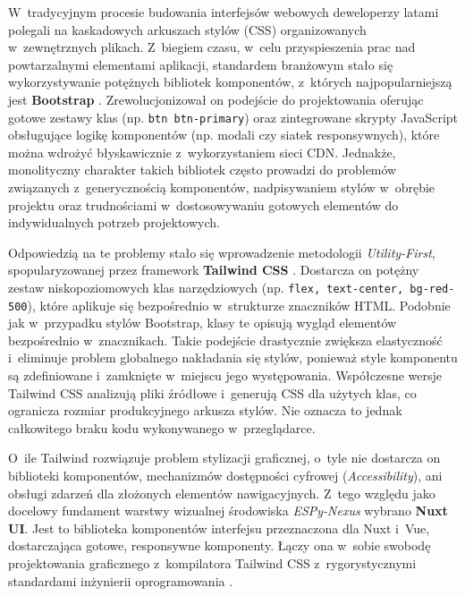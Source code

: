 W~tradycyjnym procesie budowania interfejsów webowych deweloperzy latami polegali na kaskadowych arkuszach stylów (CSS) organizowanych w~zewnętrznych plikach.
Z~biegiem czasu, w~celu przyspieszenia prac nad powtarzalnymi elementami aplikacji, standardem branżowym stało się wykorzystywanie potężnych bibliotek komponentów, z~których najpopularniejszą jest \textbf{Bootstrap} \cite{bootstrap_getting_started}.
Zrewolucjonizował on podejście do projektowania oferując gotowe zestawy klas (np. \texttt{btn btn-primary}) oraz zintegrowane skrypty JavaScript obsługujące logikę komponentów (np. modali czy siatek responsywnych), które można wdrożyć błyskawicznie z~wykorzystaniem sieci CDN.
Jednakże, monolityczny charakter takich bibliotek często prowadzi do problemów związanych z~generycznością komponentów, nadpisywaniem stylów w~obrębie projektu oraz trudnościami w~dostosowywaniu gotowych elementów do indywidualnych potrzeb projektowych.

Odpowiedzią na te problemy stało się wprowadzenie metodologii \textit{Utility-First}, spopularyzowanej przez framework \textbf{Tailwind CSS} \cite{tailwindcss_installation_vite}.
Dostarcza on potężny zestaw niskopoziomowych klas narzędziowych (np. \texttt{flex, text-center, bg-red-500}), które aplikuje się bezpośrednio w~strukturze znaczników HTML.
Podobnie jak w~przypadku stylów Bootstrap, klasy te opisują wygląd elementów bezpośrednio w~znacznikach.
Takie podejście drastycznie zwiększa elastyczność i~eliminuje problem globalnego nakładania się stylów, ponieważ style komponentu są zdefiniowane i~zamknięte w~miejscu jego występowania.
Współczesne wersje Tailwind CSS analizują pliki źródłowe i~generują CSS dla użytych klas, co ogranicza rozmiar produkcyjnego arkusza stylów.
Nie oznacza to jednak całkowitego braku kodu wykonywanego w~przeglądarce.

O~ile Tailwind rozwiązuje problem stylizacji graficznej, o~tyle nie dostarcza on biblioteki komponentów, mechanizmów dostępności cyfrowej (\textit{Accessibility}), ani obsługi zdarzeń dla złożonych elementów nawigacyjnych.
Z~tego względu jako docelowy fundament warstwy wizualnej środowiska \textit{ESPy-Nexus} wybrano \textbf{Nuxt UI}.
Jest to biblioteka komponentów interfejsu przeznaczona dla Nuxt i~Vue, dostarczająca gotowe, responsywne komponenty.
Łączy ona w~sobie swobodę projektowania graficznego z~kompilatora Tailwind CSS z~rygorystycznymi standardami inżynierii oprogramowania \cite{nuxt_ui_getting_started}.

